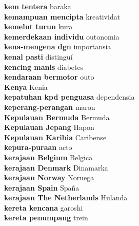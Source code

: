 \textbf{ kem tentera  } baraka \\
\textbf{ kemampuan mencipta  } kreatividat \\
\textbf{ kemelut turun  } kura \\
\textbf{ kemerdekaan individu  } outonomia \\
\textbf{ kena-mengena dgn  } importansia \\
\textbf{ kenal pasti  } distinguí \\
\textbf{ kencing manis  } diabetes \\
\textbf{ kendaraan bermotor  } outo \\
\textbf{ Kenya  } Kenia \\
\textbf{ kepatuhan kpd penguasa  } dependensia \\
\textbf{ keperang-perangan  } maron \\
\textbf{ Kepulauan Bermuda  } Bermuda \\
\textbf{ Kepulauan Jepang  } Hapon \\
\textbf{ Kepulauan Karibia  } Caribense \\
\textbf{ kepura-puraan  } acto \\
\textbf{ kerajaan Belgium  } Belgica \\
\textbf{ kerajaan Denmark  } Dinamarka \\
\textbf{ kerajaan Norway  } Noruega \\
\textbf{ kerajaan Spain  } Spaña \\
\textbf{ kerajaan The Netherlands  } Hulanda \\
\textbf{ kereta kencana  } garoshi \\
\textbf{ kereta penumpang  } trein \\
